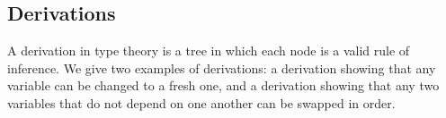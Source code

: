 \begin{comment}
\bigskip
\begin{minipage}{.45\textwidth}
\begin{prooftree}
\AxiomC{$\Gamma\vdash A~\textrm{type}$}
\AxiomC{$\Gamma,\Delta\vdash B~\textrm{type}$}
\RightLabel{$W_A$}
\BinaryInfC{$\Gamma,x:A,\Delta \vdash B~\textrm{type}$}
\end{prooftree}
\end{minipage}\hfill
\begin{minipage}{.45\textwidth}
\begin{prooftree}
\AxiomC{$\Gamma\vdash A~\textrm{type}$}
\AxiomC{$\Gamma,\Delta\vdash b:B$}
\RightLabel{$W_A$}
\BinaryInfC{$\Gamma,x:A,\Delta \vdash b:B$}
\end{prooftree}
\end{minipage}

\noindent
\begin{prooftree}
\AxiomC{$\Gamma\vdash A~\textrm{type}$}
\RightLabel{$\delta_A$}
\UnaryInfC{$\Gamma,x:A\vdash x:A$}
\end{prooftree}

\noindent
\begin{minipage}{.5\textwidth}
\begin{prooftree}
\AxiomC{$\Gamma\vdash a:A$}
\AxiomC{$\Gamma,x:A,\Delta\vdash B~\textrm{type}$}
\RightLabel{$S_a$}
\BinaryInfC{$\Gamma,\Delta[a/x]\vdash B[a/x]~\textrm{type}$}
\end{prooftree}
\end{minipage}\hfill
\begin{minipage}{.5\textwidth}
\begin{prooftree}
\AxiomC{$\Gamma\vdash a:A$}
\AxiomC{$\Gamma,x:A,\Delta\vdash b:B$}
\RightLabel{$S_a$}
\BinaryInfC{$\Gamma,\Delta[a/x]\vdash b[a/x] : B[a/x]$}
\end{prooftree}
\end{minipage}

\bigskip
\end{comment}

\subsection{Derivations}\label{sec:derivations}

A derivation in type theory is a tree in which each node is a valid rule of inference. We give two examples of derivations: a derivation showing that any variable can be changed to a fresh one, and a derivation showing that any two variables that do not depend on one another can be swapped in order.

